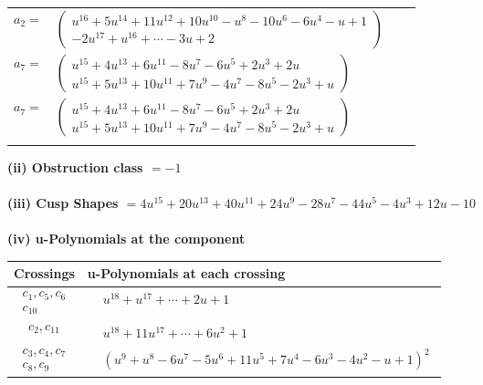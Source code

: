 \documentclass[1p]{elsarticle_modified}
\theoremstyle{definition}
\begin{document}
\begin{tabular}{m{7pt} m{180pt} m{7pt} m{180pt} }
\flushright $a_{2}=$&$\begin{pmatrix}u^{16}+5 u^{14}+11 u^{12}+10 u^{10}- u^8-10 u^6-6 u^4- u+1\\-2 u^{17}+u^{16}+\cdots-3 u+2\end{pmatrix}$ \\
\flushright $a_{7}=$&$\begin{pmatrix}u^{15}+4 u^{13}+6 u^{11}-8 u^7-6 u^5+2 u^3+2 u\\u^{15}+5 u^{13}+10 u^{11}+7 u^9-4 u^7-8 u^5-2 u^3+u\end{pmatrix}$\\ \flushright $a_{7}=$&$\begin{pmatrix}u^{15}+4 u^{13}+6 u^{11}-8 u^7-6 u^5+2 u^3+2 u\\u^{15}+5 u^{13}+10 u^{11}+7 u^9-4 u^7-8 u^5-2 u^3+u\end{pmatrix}$\\&\end{tabular}
\flushleft \textbf{(ii) Obstruction class $= -1$}\\~\\
\flushleft \textbf{(iii) Cusp Shapes $= 4 u^{15}+20 u^{13}+40 u^{11}+24 u^9-28 u^7-44 u^5-4 u^3+12 u-10$}\\~\\
\newpage\renewcommand{\arraystretch}{1}
\flushleft \textbf{(iv) u-Polynomials at the component}\newline \\
\begin{tabular}{m{50pt}|m{274pt}}
Crossings & \hspace{64pt}u-Polynomials at each crossing \\
\hline $$\begin{aligned}c_{1},c_{5},c_{6}\\c_{10}\end{aligned}$$&$\begin{aligned}
&u^{18}+u^{17}+\cdots+2 u+1
\end{aligned}$\\
\hline $$\begin{aligned}c_{2},c_{11}\end{aligned}$$&$\begin{aligned}
&u^{18}+11 u^{17}+\cdots+6 u^2+1
\end{aligned}$\\
\hline $$\begin{aligned}c_{3},c_{4},c_{7}\\c_{8},c_{9}\end{aligned}$$&$\begin{aligned}
&(u^9+u^8-6 u^7-5 u^6+11 u^5+7 u^4-6 u^3-4 u^2- u+1)^2
\end{aligned}$\\
\hline
\end{tabular}\\~\\
\end{document}
